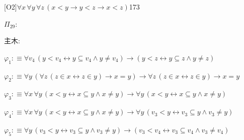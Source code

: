 \begin{fullproof}{[O2]}{$\forall x\,\forall y\,\forall z\,(x < y \to y < z \to x < z)$}{173}
\begin{ptree}
\noLine
{}
\end{ptree}
\noindent$\Pi_{29}$:
\begin{ptree}
\noLine
{}
\noLine
{}
\noLine
{}
\end{ptree}
\noindent 主木:
\begin{ptree}
\noLine
{}
\noLine
{}
\end{ptree}
\begin{abbrevlist}
\item $\varphi_{1} :\equiv \forall v_{4}\,(y < v_{4} \leftrightarrow y \subseteq v_{4} \land y \neq v_{4}) \to (y < z \leftrightarrow y \subseteq z \land y \neq z)$
\item $\varphi_{2} :\equiv \forall y\,(\forall z\,(z \in x \leftrightarrow z \in y) \to x = y) \to \forall z\,(z \in x \leftrightarrow z \in y) \to x = y$
\item $\varphi_{3} :\equiv \forall x\,\forall y\,(x < y \leftrightarrow x \subseteq y \land x \neq y) \to \forall y\,(x < y \leftrightarrow x \subseteq y \land x \neq y)$
\item $\varphi_{4} :\equiv \forall x\,\forall y\,(x < y \leftrightarrow x \subseteq y \land x \neq y) \to \forall y\,(v_{3} < y \leftrightarrow v_{3} \subseteq y \land v_{3} \neq y)$
\item $\varphi_{5} :\equiv \forall y\,(v_{3} < y \leftrightarrow v_{3} \subseteq y \land v_{3} \neq y) \to (v_{3} < v_{4} \leftrightarrow v_{3} \subseteq v_{4} \land v_{3} \neq v_{4})$

\end{abbrevlist}
\end{fullproof}
